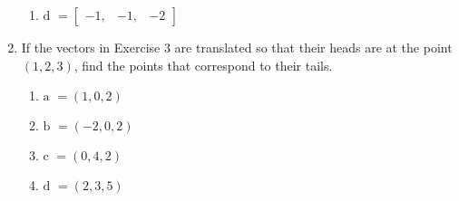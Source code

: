 \documentclass{article}
\begin{document}
\begin{enumerate}
\begin{enumerate}
		\item $\text{d } = \begin{bmatrix} -1, & -1, & -2 \end{bmatrix}$
	\end{enumerate}

	\item If the vectors in Exercise 3 are translated so that their
		heads are at the point $(1, 2, 3)$, find the points that
		correspond to their tails.

	\begin{enumerate}

		\item $\text{a } = (1,0,2)$

		\item $\text{b } = (-2,0,2)$

		\item $\text{c } = (0,4,2)$

		\item $\text{d } = (2,3,5)$

	\end{enumerate}

\end{enumerate}
\end{document}
